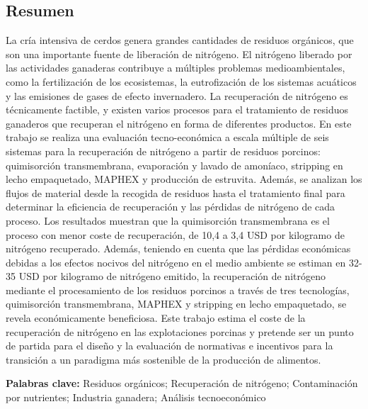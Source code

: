 \begin{refsection}[referencesCh6]
\section*{Resumen}
La cría intensiva de cerdos genera grandes cantidades de residuos orgánicos, que son una importante fuente de liberación de nitrógeno. El nitrógeno liberado por las actividades ganaderas contribuye a múltiples problemas medioambientales, como la fertilización de los ecosistemas, la eutrofización de los sistemas acuáticos y las emisiones de gases de efecto invernadero. La recuperación de nitrógeno es técnicamente factible, y existen varios procesos para el tratamiento de residuos ganaderos que recuperan el nitrógeno en forma de diferentes productos. En este trabajo se realiza una evaluación tecno-económica a escala múltiple de seis sistemas para la recuperación de nitrógeno a partir de residuos porcinos: quimisorción transmembrana, evaporación y lavado de amoníaco, stripping en lecho empaquetado, MAPHEX y producción de estruvita. Además, se analizan los flujos de material desde la recogida de residuos hasta el tratamiento final para determinar la eficiencia de recuperación y las pérdidas de nitrógeno de cada proceso. Los resultados muestran que la quimisorción transmembrana es el proceso con menor coste de recuperación, de 10,4 a 3,4 USD por kilogramo de nitrógeno recuperado. Además, teniendo en cuenta que las pérdidas económicas debidas a los efectos nocivos del nitrógeno en el medio ambiente se estiman en 32-35 USD por kilogramo de nitrógeno emitido, la recuperación de nitrógeno mediante el procesamiento de los residuos porcinos a través de tres tecnologías, quimisorción transmembrana, MAPHEX y stripping en lecho empaquetado, se revela económicamente beneficiosa. Este trabajo estima el coste de la recuperación de nitrógeno en las explotaciones porcinas y pretende ser un punto de partida para el diseño y la evaluación de normativas e incentivos para la transición a un paradigma más sostenible de la producción de alimentos.

\bigskip
\textbf{Palabras clave:} Residuos orgánicos; Recuperación de nitrógeno; Contaminación por nutrientes; Industria ganadera; Análisis tecnoeconómico
\newpage


\end{refsection}
